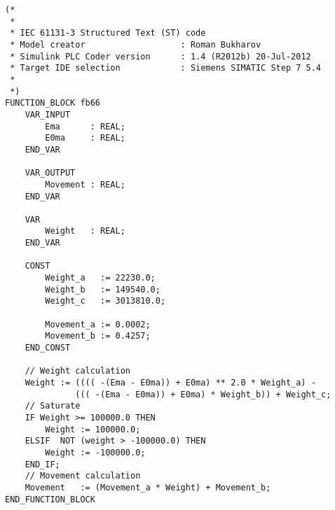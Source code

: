 \begin{verbatim}
(*
 *
 * IEC 61131-3 Structured Text (ST) code
 * Model creator                   : Roman Bukharov
 * Simulink PLC Coder version      : 1.4 (R2012b) 20-Jul-2012
 * Target IDE selection            : Siemens SIMATIC Step 7 5.4
 *
 *)
FUNCTION_BLOCK fb66
    VAR_INPUT
        Ema      : REAL;
        E0ma     : REAL;
    END_VAR
    
    VAR_OUTPUT
        Movement : REAL;
    END_VAR
    
    VAR
        Weight   : REAL;
    END_VAR
    
    CONST
        Weight_a   := 22230.0;
        Weight_b   := 149540.0;
        Weight_c   := 3013810.0;

        Movement_a := 0.0002;
        Movement_b := 0.4257;
    END_CONST
    
    // Weight calculation
    Weight := (((( -(Ema - E0ma)) + E0ma) ** 2.0 * Weight_a) - 
              ((( -(Ema - E0ma)) + E0ma) * Weight_b)) + Weight_c;
    // Saturate
    IF Weight >= 100000.0 THEN 
        Weight := 100000.0; 
    ELSIF  NOT (weight > -100000.0) THEN 
        Weight := -100000.0;
    END_IF;
    // Movement calculation
    Movement   := (Movement_a * Weight) + Movement_b;
END_FUNCTION_BLOCK
\end{verbatim}

